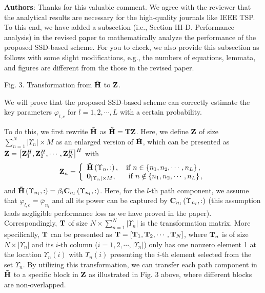 \documentclass[a4paper,12pt]{article}
\begin{document}
{\color{blue} \textbf{Authors}: Thanks for this valuable comment. We agree with the reviewer that the analytical results are necessary for the high-quality journals like IEEE TSP. To this end, we have added a subsection (i.e., Section III-D. Performance analysis) in the revised paper to mathematically analyze the performance of the proposed SSD-based scheme. For you to check, we also provide this subsection as follows with some slight modifications, e.g., the numbers of equations, lemmata, and figures are different from the those in the revised paper.


Fig. 3. Transformation from ${{\bf{\tilde H}}}$ to ${{\bf{Z}}}$.

\begin{framed}
{\color{red} We will prove that the proposed SSD-based scheme can correctly estimate the key parameters ${{\varphi _{l,c}}}$ for ${l = 1,2, \cdots ,L}$ with a certain probability.

To do this, we first rewrite ${{\bf{\tilde H}}}$ as ${{\bf{\tilde H}} = {\bf{TZ}}}$. Here, we define ${{\bf{Z}}}$ of size ${\sum\nolimits_{n = 1}^N {\left| {{\Upsilon _n}} \right|} \times M}$ as an enlarged version of ${{\bf{\tilde H}}}$, which can be presented as ${{\bf{Z}} = {\left[ {{\bf{Z}}_1^H,{\bf{Z}}_2^H, \cdots ,{\bf{Z}}_N^H} \right]^H}}$ with
\begin{equation}\label{eq1}
{{\bf{Z}}_n} = \left\{ \begin{array}{l}
{\bf{\tilde H}}\left( {{\Upsilon _n},:} \right),\quad {\rm{if}}\;n \in \left\{ {{n_1},{n_2}, \cdots ,{n_L}} \right\},\\
{{\bf{0}}_{\left| {{\Upsilon _n}} \right| \times M}},\quad \,\;\;{\rm{if}}\;n \notin \left\{ {{n_1},{n_2}, \cdots ,{n_L}} \right\},
\end{array} \right.
\end{equation}
and ${{\bf{\tilde H}}\left( {{\Upsilon _{{n_l}}},:} \right) = {\beta _l}{{\bf{C}}_{{n_l}}}\left( {{\Upsilon _{{n_l}}},:} \right)}$. Here, for the ${l}$-th path component, we assume that ${{\varphi _{l,c}} = {\bar \varphi _{{n_l}}}}$ and all its power can be captured by ${{{\bf{C}}_{{n_l}}}\left( {{\Upsilon _{{n_l}}},:} \right)}$ (this assumption leads negligible performance loss as we have proved in the paper). Correspondingly, ${{\bf{T}}}$ of size ${N \times \sum\nolimits_{n = 1}^N {\left| {{\Upsilon _n}} \right|}}$ is the transformation matrix. More specifically, ${{\bf{T}}}$ can be presented as ${{\bf{T}} = \left[ {{{\bf{T}}_1},{{\bf{T}}_2}, \cdots ,{{\bf{T}}_N}} \right]}$, where ${{{\bf{T}}_n}}$ is of size ${N \times \left| {{\Upsilon _n}} \right|}$ and its ${i}$-th column (${i = 1,2, \cdots ,\left| {{\Upsilon _n}} \right|}$) only has one nonzero element 1 at the location ${{\Upsilon _n}\left( i \right)}$ with ${{\Upsilon _n}\left( i \right)}$  presenting the ${i}$-th element selected from the set ${{\Upsilon _n}}$. By utilizing this transformation, we can transfer each path component in ${{\bf{\tilde H}}}$ to a specific block in ${{\bf{Z}}}$ as illustrated in Fig. 3 above, where different blocks are non-overlapped.




}
\end{framed}}
\end{document}
